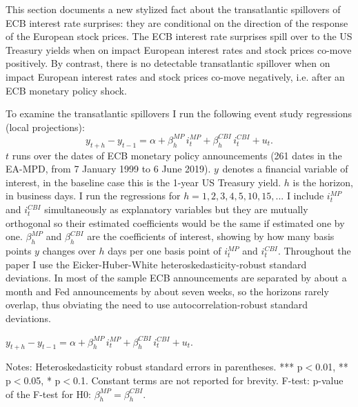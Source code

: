 \documentclass[a4paper,12pt]{article}
\newcommand{\pathTables}{../workm_lp/}
\begin{document}
This section documents a new stylized fact about the transatlantic spillovers of ECB interest rate
surprises: they are conditional on the direction of the response of the European stock prices.
The ECB interest rate surprises spill over to the US Treasury yields
when on impact European interest rates and stock prices co-move positively.
By contrast, there is no detectable transatlantic spillover when on impact
European interest rates and stock prices co-move negatively, i.e. after an ECB monetary policy shock.

To examine the transatlantic spillovers I run the following event study regressions (local projections):
\begin{equation}
y^{}_{t+h}-y^{}_{t-1} = \alpha + \beta^{MP}_h\, i^{MP}_t + \beta^{CBI}_h\, i^{CBI}_t + u_t.\label{eq: event study reg 2}
\end{equation}
$t$ runs over the dates of ECB monetary policy announcements (261 dates in the EA-MPD, from 7 January 1999 to 6 June 2019). $y^{}$ denotes a financial variable of interest, in the baseline case this is the 1-year US Treasury yield. 
$h$ is the horizon, in business days. I run the regressions for $h=1,2,3,4,5,10,15,...$
I include $i^{MP}_t$ and $i^{CBI}_t$ simultaneously as explanatory variables but they are mutually orthogonal so their estimated coefficients would be the same if estimated one by one.
$\beta_h^{MP}$ and $\beta_h^{CBI}$ are the coefficients of interest, showing by how many basis points $y$ changes over $h$ days per one basis point of $i^{MP}_t$ and $i^{CBI}_t$. Throughout the paper I use the Eicker-Huber-White heteroskedasticity-robust standard deviations. In most of the sample ECB announcements are separated by about a month and Fed announcements by about seven weeks, so the horizons rarely overlap, thus obviating the need to use autocorrelation-robust standard deviations.

\begin{table}[!htbp]
\begin{center}
\caption{The effect of ECB monetary policy and information shocks on financial variables}\label{tab: lp ecb shocks 1y}
$y^{}_{t+h}-y^{}_{t-1} = \alpha + \beta^{MP}_h\, i^{MP}_t + \beta^{CBI}_h\, i^{CBI}_t + u_t.$
\small
{}
\end{center}\footnotesize
Notes: Heteroskedasticity robust standard errors in parentheses. *** p$<$0.01, ** p$<$0.05, * p$<$0.1.
Constant terms are not reported for brevity.
F-test: p-value of the F-test for H0: $\beta^{MP}_h=\beta^{CBI}_h$.
\end{table}
\end{document}
